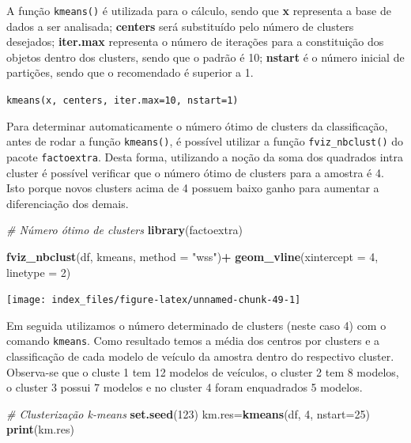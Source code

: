 \documentclass[12pt,brazil,oneside]{book}
\newenvironment{Shaded}{\begin{snugshade}}{\end{snugshade}}
\newcommand{\CommentTok}[1]{\textcolor[rgb]{0.56,0.35,0.01}{\textit{#1}}}
\newcommand{\DataTypeTok}[1]{\textcolor[rgb]{0.13,0.29,0.53}{#1}}
\newcommand{\DecValTok}[1]{\textcolor[rgb]{0.00,0.00,0.81}{#1}}
\newcommand{\KeywordTok}[1]{\textcolor[rgb]{0.13,0.29,0.53}{\textbf{#1}}}
\newcommand{\NormalTok}[1]{#1}
\newcommand{\OperatorTok}[1]{\textcolor[rgb]{0.81,0.36,0.00}{\textbf{#1}}}
\newcommand{\StringTok}[1]{\textcolor[rgb]{0.31,0.60,0.02}{#1}}
\begin{document}
A função \texttt{kmeans()} é utilizada para o cálculo, sendo que \textbf{x} representa a base de dados a ser analisada; \textbf{centers} será substituído pelo número de clusters desejados; \textbf{iter.max} representa o número de iterações para a constituição dos objetos dentro dos clusters, sendo que o padrão é 10; \textbf{nstart} é o número inicial de partições, sendo que o recomendado é superior a 1.

\texttt{kmeans(x,\ centers,\ iter.max=10,\ nstart=1)}

Para determinar automaticamente o número ótimo de clusters da classificação, antes de rodar a função \texttt{kmeans()}, é possível utilizar a função \texttt{fviz\_nbclust()} do pacote \texttt{factoextra}. Desta forma, utilizando a noção da soma dos quadrados intra cluster é possível verificar que o número ótimo de clusters para a amostra é 4. Isto porque novos clusters acima de 4 possuem baixo ganho para aumentar a diferenciação dos demais.

\begin{Shaded}
\begin{Highlighting}[]
\CommentTok{# Número ótimo de clusters}
\KeywordTok{library}\NormalTok{(factoextra)}

\KeywordTok{fviz_nbclust}\NormalTok{(df, kmeans, }\DataTypeTok{method =} \StringTok{"wss"}\NormalTok{)}\OperatorTok{+}
\StringTok{  }\KeywordTok{geom_vline}\NormalTok{(}\DataTypeTok{xintercept =} \DecValTok{4}\NormalTok{, }\DataTypeTok{linetype =} \DecValTok{2}\NormalTok{)}
\end{Highlighting}
\end{Shaded}

\begin{center}\texttt{[image: index\_files/figure-latex/unnamed-chunk-49-1]} \end{center}

Em seguida utilizamos o número determinado de clusters (neste caso 4) com o comando \texttt{kmeans}. Como resultado temos a média dos centros por clusters e a classificação de cada modelo de veículo da amostra dentro do respectivo cluster. Observa-se que o cluste 1 tem 12 modelos de veículos, o cluster 2 tem 8 modelos, o cluster 3 possui 7 modelos e no cluster 4 foram enquadrados 5 modelos.

\begin{Shaded}
\begin{Highlighting}[]
\CommentTok{# Clusterização k-means}
\KeywordTok{set.seed}\NormalTok{(}\DecValTok{123}\NormalTok{)}
\NormalTok{km.res=}\KeywordTok{kmeans}\NormalTok{(df, }\DecValTok{4}\NormalTok{, }\DataTypeTok{nstart=}\DecValTok{25}\NormalTok{)}
\KeywordTok{print}\NormalTok{(km.res)}
\end{Highlighting}
\end{Shaded}
\end{document}
